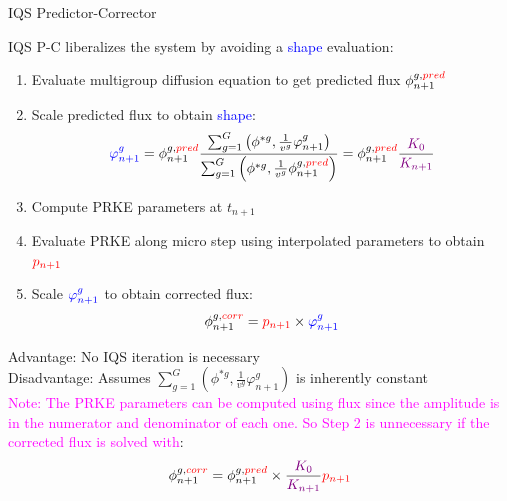 \documentclass[8pt]{beamer}
\newcommand{\ben}{\begin{enumerate}}
\newcommand{\een}{\end{enumerate}}
\newcommand{\tcr}[1]{\textcolor{red}{#1}}
\newcommand{\tcb}[1]{\textcolor{blue}{#1}}
\newcommand{\tcm}[1]{\textcolor{magenta}{#1}}
\newcommand{\tcp}[1]{\textcolor{violet}{#1}}
\begin{document}
\begin{frame}{IQS Predictor-Corrector}

IQS P-C liberalizes the system by avoiding a \tcb{shape} evaluation: 
\ben
\item Evaluate multigroup diffusion equation to get predicted flux $\phi_{n+1}^{g,\tcr{pred}}$
\item Scale predicted flux to obtain \tcb{shape}:
\[
\tcb{\varphi^{g}_{n+1}} = \phi_{n+1}^{g,\tcr{pred}} \frac{\sum_{g=1}^G\left(\phi^{*g},\frac{1}{v^g}\varphi^g_{n+1}\right)}{\sum_{g=1}^G \left(\phi^{*g},\frac{1}{v^g}\phi_{n+1}^{g,\tcr{pred}}\right)} = \phi_{n+1}^{g,\tcr{pred}} \frac{\tcp{K_0}}{\tcp{K_{n+1}}}
\]
\item Compute PRKE parameters at $t_{n+1}$
\item Evaluate PRKE along micro step using interpolated parameters to obtain $\tcr{p_{n+1}}$
\item Scale $\tcb{\varphi^{g}_{n+1}}$ to obtain corrected flux:
\[
\phi_{n+1}^{g,\tcr{corr}} = \tcr{p_{n+1}} \times \tcb{\varphi^{g}_{n+1}}
\]
\een

 Advantage: No IQS iteration is necessary \\
 Disadvantage: Assumes $\sum_{g=1}^G\left(\phi^{*g},\frac{1}{v^g}\varphi^g_{n+1}\right)$ is inherently constant \\
\vspace{2mm}
\small \tcm{Note: The PRKE parameters can be computed using flux since the amplitude is in the numerator and denominator of each one. So Step 2 is unnecessary if the corrected flux is solved with}:
\[
\phi_{n+1}^{g,\tcr{corr}} = \phi_{n+1}^{g,\tcr{pred}} \times \frac{\tcp{K_0}}{\tcp{K_{n+1}}} \tcr{p_{n+1}}
\]
\normalsize

\end{frame}
\end{document}
